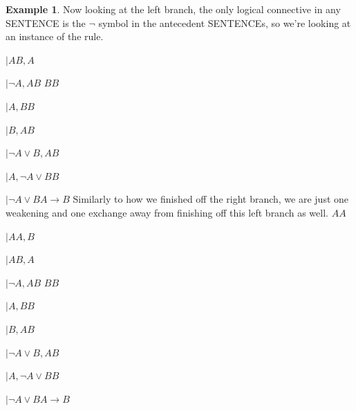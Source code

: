 \documentclass[10pt,a4paper]{article}
\newcommand*{\olup}[1]{\MakeUppercase{#1}}
\theoremstyle{plain}
\theoremstyle{definition}
\newtheorem{ex}[thm]{Example}
\theoremstyle{remark}
\providecommand{\AxiomC}[1]{}
\providecommand{\RightLabel}[1]{}
\providecommand{\fCenter}{}
\newenvironment{prooftree}{}{}
\providecommand{\lif}{\mathbin{\rightarrow}}
\providecommand{\LeftR}[1]{}
\providecommand{\RightR}[1]{}
\providecommand{\UnaryInf}{\ensuremath{\mid}}
\providecommand{\BinaryInf}{\ensuremath{\mid}}
\providecommand{\Weakening}{\mathrm{Wk}}
\providecommand{\RightR}{\mathrm{R}}
\providecommand{\LeftR}{\mathrm{L}}
\providecommand{\Axiom}{\mathrm{Ax}}
\begin{document}
\begin{ex}
Now looking at the left branch, the only logical connective in any
\olup{sentence} is the $\lnot$ symbol in the antecedent \olup{sentence}s, so
we're looking at an instance of the \LeftR{\lnot} rule.
\begin{prooftree}
\AxiomC{}
\UnaryInf$ A \fCenter B, A$
\RightLabel{\LeftR{\lnot}}
\UnaryInf$\lnot A, A \fCenter B$
\Axiom$B \fCenter B$
\RightLabel{\LeftR{\Weakening}}
\UnaryInf$A, B \fCenter B$
\RightLabel{\LeftR{\Exchange}}
\UnaryInf$B, A \fCenter B$
\RightLabel{\LeftR{\lor}}
\BinaryInf$\lnot A \lor B, A \fCenter B $
\RightLabel{\RightR{\Exchange}}
\UnaryInf$ A, \lnot A \lor B \fCenter B $
\RightLabel{\RightR{\lif}}
\UnaryInf$ \lnot A \lor B \fCenter A \lif B $
\end{prooftree}
Similarly to how we finished off the right branch, we are just one
weakening and one exchange away from finishing off this left branch as well.
\begin{prooftree}
\Axiom$A \fCenter A$
\RightLabel{\RightR{\Weakening}}
\UnaryInf$ A \fCenter A, B$
\RightLabel{\RightR{\Exchange}}
\UnaryInf$ A \fCenter B, A$
\RightLabel{\LeftR{\lnot}}
\UnaryInf$\lnot A, A \fCenter B$
\Axiom$B \fCenter B$
\RightLabel{\LeftR{\Weakening}}
\UnaryInf$A, B \fCenter B$
\RightLabel{\LeftR{\Exchange}}
\UnaryInf$B, A \fCenter B$
\RightLabel{\LeftR{\lor}}
\BinaryInf$\lnot A \lor B, A \fCenter B $
\RightLabel{\RightR{\Exchange}}
\UnaryInf$ A, \lnot A \lor B \fCenter B $
\RightLabel{\RightR{\lif}}
\UnaryInf$ \lnot A \lor B \fCenter A \lif B $
\end{prooftree}
\end{ex}
\end{document}
